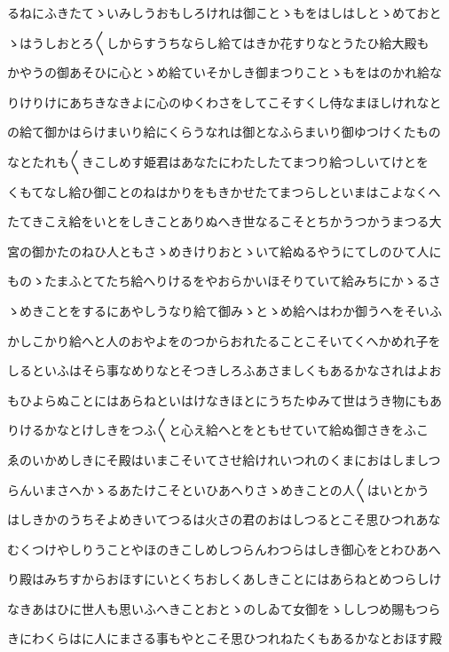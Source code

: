 \documentclass[a4paper,11pt,landscape]{ltjtarticle}
\begin{document}
るねにふきたてゝいみしうおもしろけれは御ことゝもをはしはしとゝめておと
\par\medskip
ゝはうしおとろ〱しからすうちならし給てはきか花すりなとうたひ給大殿も
\par\medskip
かやうの御あそひに心とゝめ給ていそかしき御まつりことゝもをはのかれ給な
\par\medskip
りけりけにあちきなきよに心のゆくわさをしてこそすくし侍なまほしけれなと
\par\medskip
の給て御かはらけまいり給にくらうなれは御となふらまいり御ゆつけくたもの
\par\medskip
なとたれも〱きこしめす姫君はあなたにわたしたてまつり給つしいてけとを
\par\medskip
くもてなし給ひ御ことのねはかりをもきかせたてまつらしといまはこよなくへ
\par\medskip
たてきこえ給をいとをしきことありぬへき世なるこそとちかうつかうまつる大
\par\medskip
宮の御かたのねひ人ともさゝめきけりおとゝいて給ぬるやうにてしのひて人に
\par\medskip
ものゝたまふとてたち給へりけるをやおらかいほそりていて給みちにかゝるさ
\par\medskip
ゝめきことをするにあやしうなり給て御みゝとゝめ給へはわか御うへをそいふ
\par\medskip
かしこかり給へと人のおやよをのつからおれたることこそいてくへかめれ子を
\par\medskip
しるといふはそら事なめりなとそつきしろふあさましくもあるかなされはよお
\par\medskip
もひよらぬことにはあらねといはけなきほとにうちたゆみて世はうき物にもあ
\par\medskip
りけるかなとけしきをつふ〱と心え給へとをともせていて給ぬ御さきをふこ
\par\medskip
ゑのいかめしきにそ殿はいまこそいてさせ給けれいつれのくまにおはしましつ
\par\medskip
らんいまさへかゝるあたけこそといひあへりさゝめきことの人〱はいとかう
\par\medskip
はしきかのうちそよめきいてつるは火さの君のおはしつるとこそ思ひつれあな
\par\medskip
むくつけやしりうことやほのきこしめしつらんわつらはしき御心をとわひあへ
\par\medskip
り殿はみちすからおほすにいとくちおしくあしきことにはあらねとめつらしけ
\par\medskip
なきあはひに世人も思いふへきことおとゝのしゐて女御をゝししつめ賜もつら
\par\medskip
きにわくらはに人にまさる事もやとこそ思ひつれねたくもあるかなとおほす殿
\end{document}
